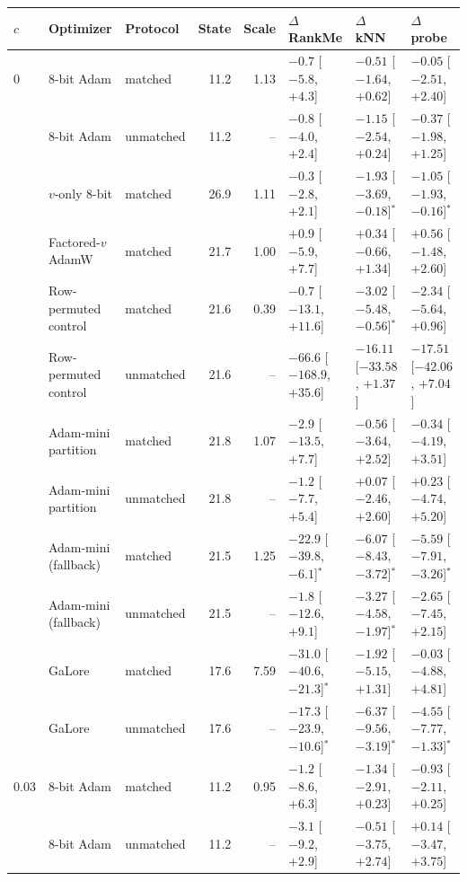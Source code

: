 \begin{tabular}{lllrrlll}
\toprule
$c$ & Optimizer & Protocol & State & Scale & $\Delta$ RankMe & $\Delta$ kNN & $\Delta$ probe \\
\midrule
0 & 8-bit Adam & matched & 11.2 & 1.13 & $-0.7$ [$-5.8$, $+4.3$] & $-0.51$ [$-1.64$, $+0.62$] & $-0.05$ [$-2.51$, $+2.40$] \\
 & 8-bit Adam & unmatched & 11.2 & -- & $-0.8$ [$-4.0$, $+2.4$] & $-1.15$ [$-2.54$, $+0.24$] & $-0.37$ [$-1.98$, $+1.25$] \\
 & $v$-only 8-bit & matched & 26.9 & 1.11 & $-0.3$ [$-2.8$, $+2.1$] & $-1.93$ [$-3.69$, $-0.18$]$^{*}$ & $-1.05$ [$-1.93$, $-0.16$]$^{*}$ \\
 & Factored-$v$ AdamW & matched & 21.7 & 1.00 & $+0.9$ [$-5.9$, $+7.7$] & $+0.34$ [$-0.66$, $+1.34$] & $+0.56$ [$-1.48$, $+2.60$] \\
 & Row-permuted control & matched & 21.6 & 0.39 & $-0.7$ [$-13.1$, $+11.6$] & $-3.02$ [$-5.48$, $-0.56$]$^{*}$ & $-2.34$ [$-5.64$, $+0.96$] \\
 & Row-permuted control & unmatched & 21.6 & -- & $-66.6$ [$-168.9$, $+35.6$] & $-16.11$ [$-33.58$, $+1.37$] & $-17.51$ [$-42.06$, $+7.04$] \\
 & Adam-mini partition & matched & 21.8 & 1.07 & $-2.9$ [$-13.5$, $+7.7$] & $-0.56$ [$-3.64$, $+2.52$] & $-0.34$ [$-4.19$, $+3.51$] \\
 & Adam-mini partition & unmatched & 21.8 & -- & $-1.2$ [$-7.7$, $+5.4$] & $+0.07$ [$-2.46$, $+2.60$] & $+0.23$ [$-4.74$, $+5.20$] \\
 & Adam-mini (fallback) & matched & 21.5 & 1.25 & $-22.9$ [$-39.8$, $-6.1$]$^{*}$ & $-6.07$ [$-8.43$, $-3.72$]$^{*}$ & $-5.59$ [$-7.91$, $-3.26$]$^{*}$ \\
 & Adam-mini (fallback) & unmatched & 21.5 & -- & $-1.8$ [$-12.6$, $+9.1$] & $-3.27$ [$-4.58$, $-1.97$]$^{*}$ & $-2.65$ [$-7.45$, $+2.15$] \\
 & GaLore & matched & 17.6 & 7.59 & $-31.0$ [$-40.6$, $-21.3$]$^{*}$ & $-1.92$ [$-5.15$, $+1.31$] & $-0.03$ [$-4.88$, $+4.81$] \\
 & GaLore & unmatched & 17.6 & -- & $-17.3$ [$-23.9$, $-10.6$]$^{*}$ & $-6.37$ [$-9.56$, $-3.19$]$^{*}$ & $-4.55$ [$-7.77$, $-1.33$]$^{*}$ \\
\midrule
0.03 & 8-bit Adam & matched & 11.2 & 0.95 & $-1.2$ [$-8.6$, $+6.3$] & $-1.34$ [$-2.91$, $+0.23$] & $-0.93$ [$-2.11$, $+0.25$] \\
 & 8-bit Adam & unmatched & 11.2 & -- & $-3.1$ [$-9.2$, $+2.9$] & $-0.51$ [$-3.75$, $+2.74$] & $+0.14$ [$-3.47$, $+3.75$] \\

\end{tabular}
